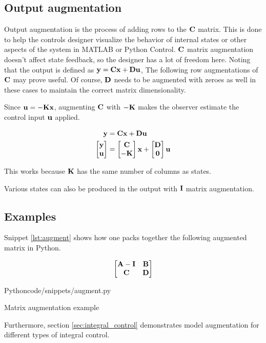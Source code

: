 \subsection{Output augmentation}

Output augmentation is the process of adding rows to the $\mathbf{C}$ matrix. This
is done to help the controls designer visualize the behavior of internal states
or other aspects of the \gls{system} in MATLAB or Python Control. $\mathbf{C}$
matrix augmentation doesn't affect \gls{state} feedback, so the designer has a
lot of freedom here. Noting that the \gls{output} is defined as
$\mathbf{y} = \mathbf{C}\mathbf{x} + \mathbf{D}\mathbf{u}$, The following row augmentations of
$\mathbf{C}$ may prove useful. Of course, $\mathbf{D}$ needs to be augmented with
zeroes as well in these cases to maintain the correct matrix dimensionality.

Since $\mathbf{u} = -\mathbf{K}\mathbf{x}$, augmenting $\mathbf{C}$ with $-\mathbf{K}$ makes
the \gls{observer} estimate the \gls{control input} $\mathbf{u}$ applied.

\begin{align*}
  \mathbf{y} &= \mathbf{C}\mathbf{x} + \mathbf{D}\mathbf{u} \\
  \begin{bmatrix}
    \mathbf{y} \\
    \mathbf{u}
  \end{bmatrix} &=
  \begin{bmatrix}
    \mathbf{C} \\
    -\mathbf{K}
  \end{bmatrix}
  \mathbf{x} +
  \begin{bmatrix}
    \mathbf{D} \\
    \mathbf{0}
  \end{bmatrix}
  \mathbf{u}
\end{align*}

This works because $\mathbf{K}$ has the same number of columns as \glspl{state}.

Various \glspl{state} can also be produced in the \gls{output} with $\mathbf{I}$
matrix augmentation.

\subsection{Examples}

Snippet \ref{lst:augment} shows how one packs together the following augmented
matrix in Python.

\begin{equation*}
  \begin{bmatrix}
    \mathbf{A} - \mathbf{I} & \mathbf{B} \\
    \mathbf{C} & \mathbf{D}
  \end{bmatrix}
\end{equation*}

\begin{code}{Python}{code/snippets/augment.py}
  \caption{Matrix augmentation example}
  \label{lst:augment}
\end{code}

Furthermore, section \ref{sec:integral_control} demonstrates \gls{model}
augmentation for different types of integral control.
